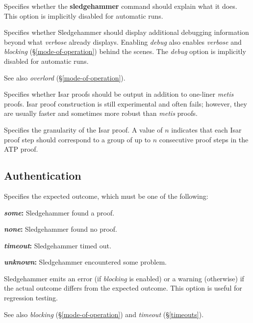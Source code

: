 \documentclass[a4paper,12pt]{article}
\begin{document}
\begin{enum}

Specifies whether the \textbf{sledgehammer} command should explain what it does.
This option is implicitly disabled for automatic runs.

Specifies whether Sledgehammer should display additional debugging information
beyond what \textit{verbose} already displays. Enabling \textit{debug} also
enables \textit{verbose} and \textit{blocking} (\S\ref{mode-of-operation})
behind the scenes. The \textit{debug} option is implicitly disabled for
automatic runs.

\nopagebreak
{\small See also \textit{overlord} (\S\ref{mode-of-operation}).}

Specifies whether Isar proofs should be output in addition to one-liner
\textit{metis} proofs. Isar proof construction is still experimental and often
fails; however, they are usually faster and sometimes more robust than
\textit{metis} proofs.

Specifies the granularity of the Isar proof. A value of $n$ indicates that each
Isar proof step should correspond to a group of up to $n$ consecutive proof
steps in the ATP proof.
\end{enum}

\subsection{Authentication}
\label{authentication}

\begin{enum}
Specifies the expected outcome, which must be one of the following:

\begin{enum}
\item[\labelitemi] \textbf{\textit{some}:} Sledgehammer found a proof.
\item[\labelitemi] \textbf{\textit{none}:} Sledgehammer found no proof.
\item[\labelitemi] \textbf{\textit{timeout}:} Sledgehammer timed out.
\item[\labelitemi] \textbf{\textit{unknown}:} Sledgehammer encountered some
problem.
\end{enum}

Sledgehammer emits an error (if \textit{blocking} is enabled) or a warning
(otherwise) if the actual outcome differs from the expected outcome. This option
is useful for regression testing.

\nopagebreak
{\small See also \textit{blocking} (\S\ref{mode-of-operation}) and
\textit{timeout} (\S\ref{timeouts}).}
\end{enum}
\end{document}
